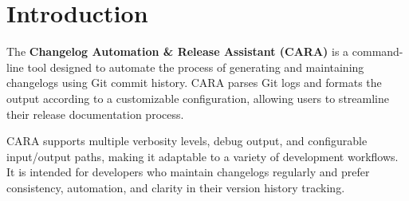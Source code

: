 \chapter{Introduction}
\label{ch:introduction}
\pagestyle{fancy}

The \textbf{Changelog Automation \& Release Assistant (CARA)} is a command-line tool designed to automate the process of generating and maintaining changelogs using Git commit history. CARA parses Git logs and formats the output according to a customizable configuration, allowing users to streamline their release documentation process.

CARA supports multiple verbosity levels, debug output, and configurable input/output paths, making it adaptable to a variety of development workflows. It is intended for developers who maintain changelogs regularly and prefer consistency, automation, and clarity in their version history tracking.
